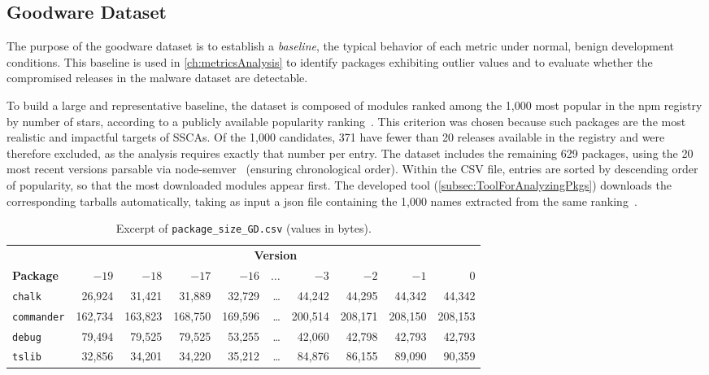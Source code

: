 \subsection{Goodware Dataset}
\label{subsec:goodwareDataset}

The purpose of the goodware dataset is to establish a \emph{baseline}, 
the typical behavior of each metric under normal, benign development conditions.
This baseline is used in \cref{ch:metricsAnalysis} to identify packages exhibiting outlier values
and to evaluate whether the compromised releases in the malware dataset are detectable.

To build a large and representative baseline, 
the dataset is composed of modules ranked among the 1,000 most popular in the \ac{npm} registry by number of stars, 
according to a publicly available popularity ranking~\cite{tristan2026listtop10000}.
This criterion was chosen because such packages are the most realistic and impactful targets of \acp{SSCA}.
Of the 1,000 candidates, 371 have fewer than 20 releases available in the registry and were therefore excluded, 
as the analysis requires exactly that number per entry.
The dataset includes the remaining 629 packages, 
using the 20 most recent versions parsable via node-semver~\cite{semver} (ensuring chronological order).
Within the CSV file, entries are sorted by descending order of popularity,
so that the most downloaded modules appear first.
The developed tool (\cref{subsec:ToolForAnalyzingPkgs}) downloads the corresponding tarballs automatically,
taking as input a json file containing the 1,000 names 
extracted from the same ranking~\cite{tristan2026listtop10000}.

\begin{table}[htb]
\centering
\footnotesize
\caption{Excerpt of \texttt{package\_size\_GD.csv} (values in bytes).}
\label{tab:csv-goodware}
\begin{tabularx}{\textwidth}{@{} l r r r r r r r r r @{}}
\toprule
 & \multicolumn{9}{c}{\textbf{Version}} \\ \cmidrule(l){2-10}
\textbf{Package} & \textbf{$-19$} & \textbf{$-18$} & \textbf{$-17$} & \textbf{$-16$} & \textbf{$\ldots$}  & \textbf{$-3$} & \textbf{$-2$} & \textbf{$-1$} & \textbf{$0$} \\
\midrule
\texttt{chalk}     & 26,924  & 31,421  & 31,889  & 32,729 & \ldots & 44,242 & 44,295  & 44,342  & 44,342  \\
\texttt{commander} & 162,734 & 163,823 & 168,750 & 169,596 & \ldots & 200,514 & 208,171 & 208,150 & 208,153 \\
\texttt{debug}     & 79,494  & 79,525  & 79,525  & 53,255 & \ldots & 42,060 & 42,798  & 42,793  & 42,793  \\
\texttt{tslib}     & 32,856  & 34,201  & 34,220  & 35,212 & \ldots & 84,876 & 86,155  & 89,090  & 90,359  \\
\bottomrule
\end{tabularx}
\end{table}

